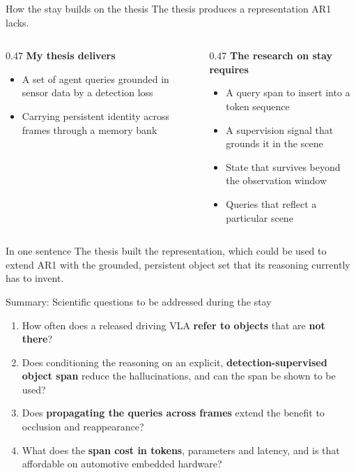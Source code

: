 \documentclass[aspectratio=169,11pt,t]{beamer}
\begin{document}
\begin{frame}{How the stay builds on the thesis}
  The thesis produces a representation AR1 lacks.

  \vspace{0.4em}
  \begin{columns}[T,onlytextwidth]
    \begin{column}{0.47\textwidth}
      \textbf{\color{tuered}My thesis delivers}
      \begin{itemize}
        \footnotesize
        \item A set of agent queries grounded in sensor data by a detection loss
        \item Carrying persistent identity across frames through a memory bank

      \end{itemize}
    \end{column}
    \begin{column}{0.47\textwidth}
      \textbf{\color{tuered}The research on stay requires}
      \begin{itemize}
        \footnotesize
        \item A query span to insert into a token sequence
        \item A supervision signal that grounds it in the scene
        \item State that survives beyond the observation window
        \item Queries that reflect a particular scene
      \end{itemize}
    \end{column}
  \end{columns}

  \vspace{0.5em}
  \begin{block}{In one sentence}
    The thesis built the representation, which could be used to extend AR1 with the grounded, persistent object set that its reasoning currently has to invent.
  \end{block}
\end{frame}

\begin{frame}{Summary: Scientific questions to be addressed during the stay}
  \begin{enumerate}
    \item How often does a released driving VLA \textbf{refer to objects} that are \textbf{not
      there}?
    \item Does conditioning the reasoning on an explicit, \textbf{detection-supervised
      object span} reduce the hallucinations, and can the span be shown to be used?
    \item Does \textbf{propagating the queries across frames} extend the benefit to
      occlusion and reappearance?
    \item What does the \textbf{span cost in tokens}, parameters and latency, and is
      that affordable on automotive embedded hardware?
  \end{enumerate}
\end{frame}
\end{document}
